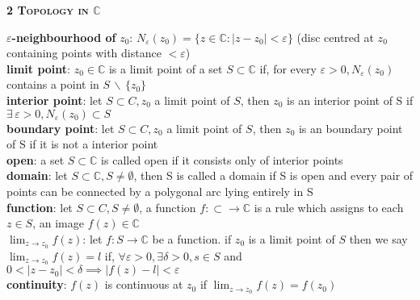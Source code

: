 \documentclass[a4paper]{article}
\newcommand*\abs[1]{\vert #1 \vert}
\newcommand*\setremove[2]{#1 \, \backslash \, #2}
\begin{document}
\begin{framed}
	\begin{center}
		\textbf{\textsc{2 Topology in $\mathbb{C}$}}
	\end{center}
	$\varepsilon$\textbf{-neighbourhood of} $z_0$: $N_\varepsilon(z_0) = \{z \in \mathbb{C} : \abs{z - z_0} < \varepsilon \}$ (disc centred at $z_0$ containing points with distance $< \varepsilon$)\\
	
	\noindent
	\textbf{limit point}: $z_0 \in \mathbb{C}$ is a limit point of a set $S \subset \mathbb{C}$ if, for every $\varepsilon > 0, N_\varepsilon(z_0)$ contains a point in $\setremove{S}{\{z_0\}}$\\
	
	\noindent
	\textbf{interior point}: let $S \subset C, z_0$ a limit point of $S$, then $z_0$ is an interior point of S if $\exists \, \varepsilon > 0, N_\varepsilon (z_0) \subset S$\\
	
	\noindent
	\textbf{boundary point}: let $S \subset C, z_0$ a limit point of $S$, then $z_0$ is an boundary point of S if it is not a interior point\\
	
	\noindent
	\textbf{open}: a set $S \subset \mathbb{C}$ is called open if it consists only of interior points\\
	
	\noindent
	\textbf{domain}: let $S \subset \mathbb{C}, S \neq \emptyset$, then S is called a domain if S is open and every pair of points can be connected by a polygonal arc lying entirely in S\\
	
	\noindent
	\textbf{function}: let $S \subset C, S \neq \emptyset$, a function $f: \subset \rightarrow \mathbb{C}$ is a rule which assigns to each $z \in S$, an image $f(z) \in \mathbb{C}$\\
	
	\noindent
	\textbf{$\lim_{z \rightarrow z_0} f(z)$}: let $f: S \rightarrow \mathbb{C}$ be a function. if $z_0$ is a limit point of $S$ then we say $\lim_{z \rightarrow z_0} f(z) = l$ if, $\forall \varepsilon > 0, \exists \delta > 0, s \in S$ and $0 < \abs{z - z_0} < \delta \implies \abs{f(z) - l} < \varepsilon$\\
	
	\noindent
	\textbf{continuity}: $f(z)$ is continuous at $z_0$ if $\lim_{z \rightarrow z_0} f(z) = f(z_0)$\\
	

\end{framed}
\end{document}

